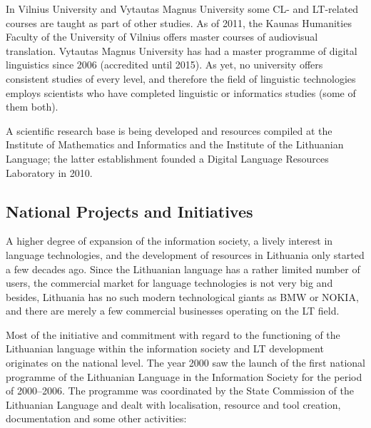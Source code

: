 \begin{multicols}{2}
In Vilnius University and Vytautas Magnus University some CL- and LT-related courses are taught as part of other studies. As of 2011, the Kaunas Humanities Faculty of the University of Vilnius offers master courses of audiovisual translation. Vytautas Magnus University has had a master programme of digital linguistics  since 2006 (accredited until 2015). As yet, no university offers consistent studies of every level, and therefore the field of linguistic technologies employs scientists who have completed linguistic or informatics studies (some of them both). 

A scientific research base is being developed and resources compiled at the Institute of Mathematics and Informatics and the Institute of the Lithuanian Language; the latter establishment founded a Digital Language Resources Laboratory in 2010.

\subsection{National Projects and Initiatives}

A higher degree of expansion of the information society, a lively interest in language technologies, and the development of resources in Lithuania only started a few decades ago. Since the Lithuanian language has a rather limited number of users, the commercial market for language technologies is not very big and besides, Lithuania has no such modern technological giants as BMW or NOKIA, and there are merely a few commercial businesses operating on the LT field.  

Most of the initiative and commitment with regard to the functioning of the Lithuanian language within the information society and LT development originates on the national level. The year 2000 saw the launch of the first national programme of the Lithuanian Language in the Information Society for the period of 2000–2006. The programme was coordinated by the State Commission of the Lithuanian Language and dealt with localisation, resource and tool creation, documentation and some other activities:


\end{multicols}
